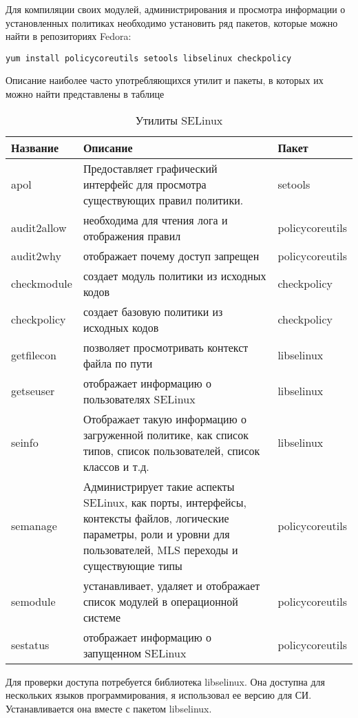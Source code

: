 \documentclass{./../class/UIR}
\begin{document}
	Для компиляции своих модулей, администрирования и просмотра информации о
	установленных политиках необходимо установить ряд пакетов, которые можно найти
	в репозиториях Fedora:
\begin{verbatim}
yum install policycoreutils setools libselinux checkpolicy
\end{verbatim}
Описание наиболее часто употребляющихся утилит и пакеты, в которых их можно
найти представлены в таблице

	\begin{longtable}[c]{|p{3cm}|p{11cm}|p{3cm}|}
	\caption{Утилиты SELinux} \\
	\textbf{Название} & \textbf{Описание} & \textbf{Пакет} \\
	\endfirsthead
	\hline
	apol & Предоставляет графический интерфейс для просмотра существующих правил
	политики. & setools \\
	\hline
	audit2allow & необходима для чтения лога и отображения правил & policycoreutils\\
	\hline
	audit2why & отображает почему доступ запрещен & policycoreutils \\
	\hline
	checkmodule & создает модуль политики из исходных кодов & checkpolicy \\
	\hline
	checkpolicy & создает базовую политики из исходных кодов & checkpolicy \\
	\hline
	getfilecon & позволяет просмотривать контекст файла по пути & libselinux \\
	\hline
	getseuser & отображает информацию о пользователях SELinux & libselinux \\
	\hline
	seinfo & Отображает такую информацию о загруженной политике, как список типов,
	список пользователей, список классов и т.д. & libselinux \\
	\hline
	semanage & Администрирует такие аспекты SELinux, как порты, интерфейсы,
	контексты файлов, логические параметры, роли и уровни для пользователей, MLS
	переходы и существующие типы & policycoreutils \\
	\hline
	semodule & устанавливает, удаляет и отображает список модулей в
	операционной системе & policycoreutils \\
	\hline
	sestatus & отображает информацию о запущенном SELinux & policycoreutils \\
	\hline	
	
	\end{longtable}
	
	Для проверки доступа потребуется библиотека libselinux. Она доступна для
	нескольких языков программирования, я использовал ее версию для СИ.
	Устанавливается она вместе с пакетом libselinux.
	
\end{document}
